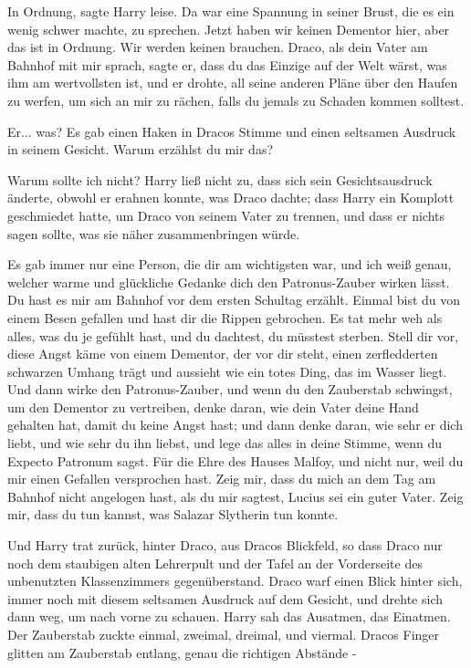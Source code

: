 \glqq In Ordnung\grqq{}, sagte Harry leise. Da war eine Spannung in seiner
Brust, die es ein wenig schwer machte, zu sprechen. \glqq Jetzt haben wir keinen
Dementor hier, aber das ist in Ordnung. Wir werden keinen brauchen. Draco, als
dein Vater am Bahnhof mit mir sprach, sagte er, dass du das Einzige auf der Welt
wärst, was ihm am wertvollsten ist, und er drohte, all seine anderen Pläne über
den Haufen zu werfen, um sich an mir zu rächen, falls du jemals zu Schaden
kommen solltest.\grqq{}

\glqq Er... was?\grqq{} Es gab einen Haken in Dracos Stimme und einen seltsamen
Ausdruck in seinem Gesicht. \glqq Warum erzählst du mir das?\grqq{}

\glqq Warum sollte ich nicht?\grqq{} Harry ließ nicht zu, dass sich sein
Gesichtsausdruck änderte, obwohl er erahnen konnte, was Draco dachte; dass Harry
ein Komplott geschmiedet hatte, um Draco von seinem Vater zu trennen, und dass
er nichts sagen sollte, was sie näher zusammenbringen würde.

\glqq Es gab immer nur eine Person, die dir am wichtigsten war, und ich weiß
genau, welcher warme und glückliche Gedanke dich den Patronus-Zauber wirken
lässt. Du hast es mir am Bahnhof vor dem ersten Schultag erzählt. Einmal bist du
von einem Besen gefallen und hast dir die Rippen gebrochen. Es tat mehr weh als
alles, was du je gefühlt hast, und du dachtest, du müsstest sterben. Stell dir
vor, diese Angst käme von einem Dementor, der vor dir steht, einen zerfledderten
schwarzen Umhang trägt und aussieht wie ein totes Ding, das im Wasser liegt. Und
dann wirke den Patronus-Zauber, und wenn du den Zauberstab schwingst, um den
Dementor zu vertreiben, denke daran, wie dein Vater deine Hand gehalten hat,
damit du keine Angst hast; und dann denke daran, wie sehr er dich liebt, und wie
sehr du ihn liebst, und lege das alles in deine Stimme, wenn du Expecto Patronum
sagst. Für die Ehre des Hauses Malfoy, und nicht nur, weil du mir einen Gefallen
versprochen hast. Zeig mir, dass du mich an dem Tag am Bahnhof nicht angelogen
hast, als du mir sagtest, Lucius sei ein guter Vater. Zeig mir, dass du tun
kannst, was Salazar Slytherin tun konnte.\grqq{}

Und Harry trat zurück, hinter Draco, aus Dracos Blickfeld, so dass Draco nur
noch dem staubigen alten Lehrerpult und der Tafel an der Vorderseite des
unbenutzten Klassenzimmers gegenüberstand. Draco warf einen Blick hinter sich,
immer noch mit diesem seltsamen Ausdruck auf dem Gesicht, und drehte sich dann
weg, um nach vorne zu schauen. Harry sah das Ausatmen, das Einatmen. Der
Zauberstab zuckte einmal, zweimal, dreimal, und viermal. Dracos Finger glitten
am Zauberstab entlang, genau die richtigen Abstände -


